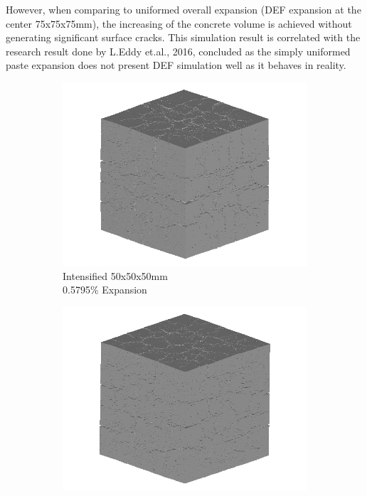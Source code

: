 However, when comparing to uniformed overall expansion (DEF expansion at the center 75x75x75mm), the increasing of the concrete volume is achieved without generating significant surface cracks. This simulation result is correlated with the research result done by L.Eddy et.al., 2016\cite{Eddy}, concluded as the simply uniformed paste expansion does not present DEF simulation well as it behaves in reality.

\begin{figure}[ht!]
\centering
    \begin{subfigure}{.3\textwidth}
      \centering
      \includegraphics[width=.9\linewidth]{Files/exp_3D/DEF/A30X0C_3_3d.png}
    \caption{Intensified 50x50x50mm \\ 0.5795\% Expansion}
    \end{subfigure}%
    \begin{subfigure}{.3\textwidth}
      \centering
      \includegraphics[width=.9\linewidth]{Files/exp_3D/DEF/A30X-5C_3_3d.png}

\end{subfigure}
\end{figure}

